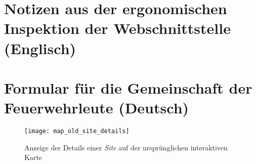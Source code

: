 



\section{Notizen aus der ergonomischen Inspektion der Webschnittstelle (Englisch)} \label{appendix:ergonomic-inspection}



\section{Formular für die Gemeinschaft der Feuerwehrleute (Deutsch)} \label{appendix:firefighter-survey}







\begin{figure}[H]
  \centering
  \texttt{[image: map\_old\_site\_details]}
  \caption{Anzeige der Details einer \textit{Site} auf der ursprünglichen interaktiven Karte}
  \label{fig:map_old_site_details}
\end{figure}


